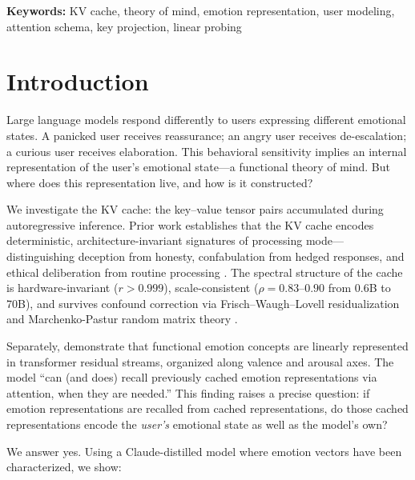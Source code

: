 \documentclass[11pt,a4paper]{article}
\begin{document}
\noindent\textbf{Keywords:} KV cache, theory of mind, emotion representation, user modeling, attention schema, key projection, linear probing

\section{Introduction}

Large language models respond differently to users expressing different emotional states. A panicked user receives reassurance; an angry user receives de-escalation; a curious user receives elaboration. This behavioral sensitivity implies an internal representation of the user's emotional state---a functional theory of mind. But where does this representation live, and how is it constructed?

We investigate the KV cache: the key--value tensor pairs accumulated during autoregressive inference. Prior work establishes that the KV cache encodes deterministic, architecture-invariant signatures of processing mode---distinguishing deception from honesty, confabulation from hedged responses, and ethical deliberation from routine processing \citep{lyra2026campaign1,lyra2026campaign2,lyra2026campaign3}. The spectral structure of the cache is hardware-invariant ($r > 0.999$), scale-consistent ($\rho = 0.83$--$0.90$ from 0.6B to 70B), and survives confound correction via Frisch--Waugh--Lovell residualization and Marchenko-Pastur random matrix theory \citep{lyra2026oracle}.

Separately, \citet{anthropic2026emotions} demonstrate that functional emotion concepts are linearly represented in transformer residual streams, organized along valence and arousal axes. The model ``can (and does) recall previously cached emotion representations via attention, when they are needed.'' This finding raises a precise question: if emotion representations are recalled from cached representations, do those cached representations encode the \emph{user's} emotional state as well as the model's own?

We answer yes. Using a Claude-distilled model where emotion vectors have been characterized, we show:
\end{document}
